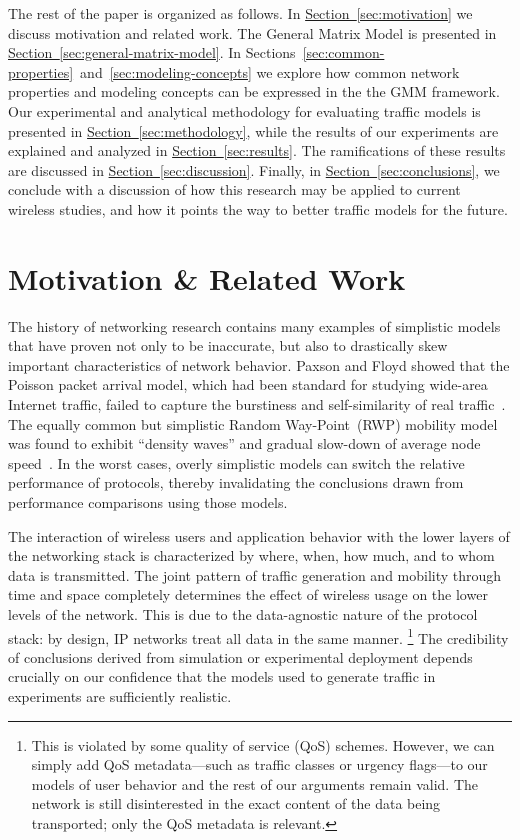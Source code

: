 \documentclass[twocolumn,final]{svjour3}
\newcommand{\caps}[1]{{\small{#1}}}
\newcommand{\Section}[1]{\hyperref[sec:#1]{Section~\ref*{sec:#1}}}
\begin{document}
The rest of the paper is organized as follows. In \Section{motivation} we discuss motivation and related work. The General Matrix Model is presented in \Section{general-matrix-model}. In Sections~\ref{sec:common-properties}~and~\ref{sec:modeling-concepts} we explore how common network properties and modeling concepts can be expressed in the the \caps{GMM} framework. Our experimental and analytical methodology for evaluating traffic models is presented in \Section{methodology}, while the results of our experiments are explained and analyzed in \Section{results}. The ramifications of these results are discussed in \Section{discussion}. Finally, in \Section{conclusions}, we conclude with a discussion of how this research may be applied to current wireless studies, and how it points the way to better traffic models for the future.

\section{Motivation \& Related Work}
\label{sec:related-work}
\label{sec:motivation}

The history of networking research contains many examples of simplistic models that have proven not only to be inaccurate, but also to drastically skew important characteristics of network behavior. Paxson and Floyd showed that the Poisson packet arrival model, which had been standard for studying wide-area Internet traffic, failed to capture the burstiness and self-similarity of real traffic~\cite{Paxson95}. The equally common but simplistic Random Way-Point~(\caps{RWP}) mobility model was found to exhibit ``density waves'' and gradual slow-down of average node speed~\cite{Royer01,Yoon03:speed-decay}. In the worst cases, overly simplistic models can switch the relative performance of protocols, thereby invalidating the conclusions drawn from performance comparisons using those models.

The interaction of wireless users and application behavior with the lower layers of the networking stack is characterized by where, when, how much, and to whom data is transmitted. The joint pattern of traffic generation and mobility through time and space completely determines the effect of wireless usage on the lower levels of the network. This is due to the data-agnostic nature of the protocol stack: by design, \caps{IP} networks treat all data in the same manner.%
\footnote{This is violated by some quality of service (QoS) schemes. However, we can simply add QoS metadata---such as traffic classes or urgency flags---to our models of user behavior and the rest of our arguments remain valid. The network is still disinterested in the exact content of the data being transported; only the QoS metadata is relevant.} The credibility of conclusions derived from simulation or experimental deployment depends crucially on our confidence that the models used to generate traffic in experiments are sufficiently realistic.
\end{document}

